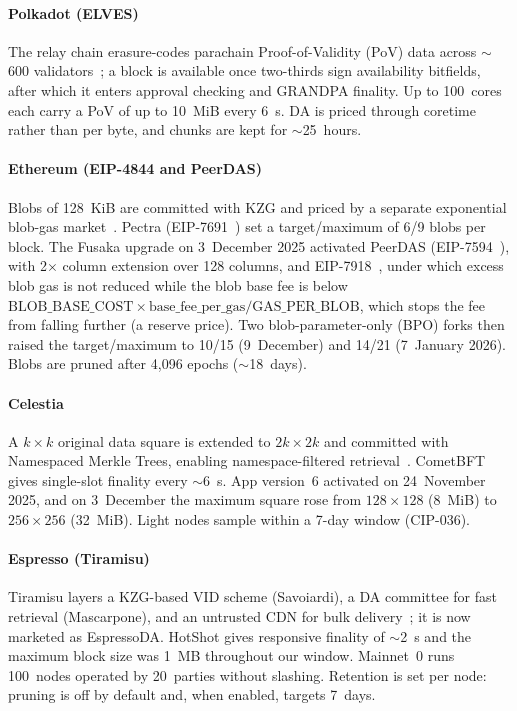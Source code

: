\paragraph{Polkadot (ELVES)}
The relay chain erasure-codes parachain Proof-of-Validity (PoV) data across $\sim$600 validators~\cite{Jeff_Burdges_ELVES, Overview_of_polkadot}; a block is available once two-thirds sign availability bitfields, after which it enters approval checking and GRANDPA finality.
Up to 100~cores each carry a PoV of up to 10~MiB every 6~s. DA is priced through coretime rather than per byte, and chunks are kept for $\sim$25~hours.

\paragraph{Ethereum (EIP-4844 and PeerDAS)}
Blobs of 128~KiB are committed with KZG and priced by a separate exponential blob-gas market~\cite{EIP-4844}.
Pectra (EIP-7691~\cite{EIP-7691}) set a target/maximum of 6/9 blobs per block.
The Fusaka upgrade on 3~December 2025 activated PeerDAS (EIP-7594~\cite{EIP-7594}), with 2$\times$ column extension over 128 columns, and EIP-7918~\cite{EIP-7918}, under which excess blob gas is not reduced while the blob base fee is below $\text{BLOB\_BASE\_COST} \times \text{base\_fee\_per\_gas} / \text{GAS\_PER\_BLOB}$, which stops the fee from falling further (a reserve price).
Two blob-parameter-only (BPO) forks then raised the target/maximum to 10/15 (9~December) and 14/21 (7~January 2026).
Blobs are pruned after 4{,}096 epochs ($\sim$18~days).

\paragraph{Celestia}
A $k \times k$ original data square is extended to $2k \times 2k$ and committed with Namespaced Merkle Trees, enabling namespace-filtered retrieval~\cite{AlBassam_LazyLedger}.
CometBFT gives single-slot finality every $\sim$6~s. App version~6 activated on 24~November 2025, and on 3~December the maximum square rose from $128 \times 128$ (8~MiB) to $256 \times 256$ (32~MiB). Light nodes sample within a 7-day window (CIP-036).

\paragraph{Espresso (Tiramisu)}
Tiramisu layers a KZG-based VID scheme (Savoiardi), a DA committee for fast retrieval (Mascarpone), and an untrusted CDN for bulk delivery~\cite{Espresso:Hotshot_and_Triamisu}; it is now marketed as EspressoDA.
HotShot gives responsive finality of $\sim$2~s and the maximum block size was 1~MB throughout our window. Mainnet~0 runs 100~nodes operated by 20~parties without slashing. Retention is set per node: pruning is off by default and, when enabled, targets 7~days.

